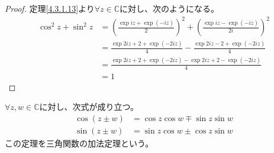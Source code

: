 \documentclass[dvipdfmx]{jsarticle}
\begin{document}
\begin{proof} 定理\ref{4.3.1.13}より$\forall z \in \mathbb{C}$に対し、次のようになる。
\begin{align*}
\cos^{2}z + \sin^{2}z &= \left( \frac{\exp{iz} + \exp( - iz)}{2} \right)^{2} + \left( \frac{\exp{iz} - \exp( - iz)}{2i} \right)^{2}\\
&= \frac{\exp{2iz} + 2 + \exp( - 2iz)}{4} - \frac{\exp{2iz} - 2 + \exp( - 2iz)}{4}\\
&= \frac{\exp{2iz} + 2 + \exp( - 2iz) - \exp{2iz} + 2 - \exp( - 2iz)}{4}\\
&= 1
\end{align*}
\end{proof}
\begin{thm}[三角関数の加法定理]\label{4.3.1.16} $\forall z,w \in \mathbb{C}$に対し、次式が成り立つ。
\begin{align*}
\cos(z \pm w) &= \cos z\cos w \mp \sin z\sin w\\
\sin(z \pm w) &= \sin z\cos w \pm \cos z\sin w
\end{align*}
この定理を三角関数の加法定理という。
\end{thm}
\end{document}

